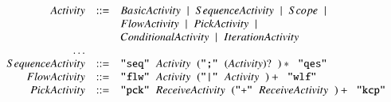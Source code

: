 $$
\begin{array}{rcl}
Activity &	::= & 	BasicActivity \hspace{0.2cm}| \hspace{0.2cm}SequenceActivity
\hspace{0.2cm}|\hspace{0.2cm} Scope \hspace{0.2cm}| \\ 
&& FlowActivity \hspace{0.2cm}| \hspace{0.2cm}PickActivity \hspace{0.2cm}|\\
&&ConditionalActivity \hspace{0.2cm}| \hspace{0.2cm}IterationActivity \\
\ldots\\ 
SequenceActivity &	::= & \verb#"seq"# \hspace{0.2cm} Activity \hspace{0.2cm} (
\verb#";"#  \hspace{0.2cm} ( Activity )? \hspace{0.2cm} )* \hspace{0.2cm}
\verb#"qes"# \\
 
FlowActivity &	::=  &	\verb#"flw"#  \hspace{0.2cm} Activity \hspace{0.2cm} (
\verb#"|"#  \hspace{0.2cm} Activity \hspace{0.2cm})+ \hspace{0.2cm}
\verb#"wlf"# \\

PickActivity &	::=  &	\verb#"pck"# \hspace{0.2cm} ReceiveActivity
\hspace{0.2cm} ( \verb#"+"#  \hspace{0.2cm} ReceiveActivity \hspace{0.2cm})+
\hspace{0.2cm} \verb#"kcp"# \\
\end{array}
$$


